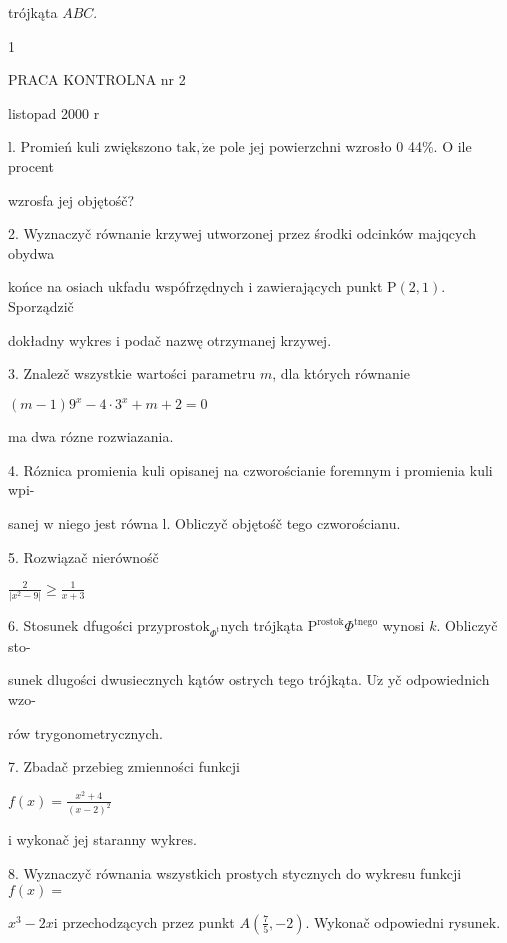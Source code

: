 \documentclass[a4paper,12pt]{article}
\begin{document}
trójkąta $ABC.$

1




PRACA KONTROLNA nr 2

listopad 2000 $\mathrm{r}$

l. Promień kuli zwiększono $\mathrm{t}\mathrm{a}\mathrm{k}, \dot{\mathrm{z}}\mathrm{e}$ pole jej powierzchni wzrosło $0$ 44\%. $\mathrm{O}$ ile procent

wzrosfa jej objętośč?

2. Wyznaczyč równanie krzywej utworzonej przez środki odcinków majqcych obydwa

końce na osiach ukfadu wspófrzędnych $\mathrm{i}$ zawierających punkt $\mathrm{P}(2,1)$. Sporządzič

dokładny wykres $\mathrm{i}$ podač nazwę otrzymanej krzywej.

3. Znalez$\acute{}$č wszystkie wartości parametru $m$, dla których równanie

$(m-1)9^{x}-4\cdot 3^{x}+m+2=0$

ma dwa rózne rozwiazania.

4. Róznica promienia kuli opisanej na czworościanie foremnym $\mathrm{i}$ promienia kuli wpi-

sanej $\mathrm{w}$ niego jest równa l. Obliczyč objętośč tego czworościanu.

5. Rozwiązač nierównośč

$\displaystyle \frac{2}{|x^{2}-9|}\geq\frac{1}{x+3}$

6. Stosunek dfugości $\mathrm{p}\mathrm{r}\mathrm{z}\mathrm{y}\mathrm{p}\mathrm{r}\mathrm{o}\mathrm{s}\mathrm{t}\mathrm{o}\mathrm{k}_{\Phi^{\mathrm{t}}}$nych trójkąta $\mathrm{P}^{\mathrm{r}\mathrm{o}\mathrm{s}\mathrm{t}\mathrm{o}\mathrm{k}}\Phi^{\mathrm{t}\mathrm{n}\mathrm{e}\mathrm{g}\mathrm{o}}$ wynosi $k$. Obliczyč sto-

sunek dlugości dwusiecznych kątów ostrych tego trójkąta. $\mathrm{U}\dot{\mathrm{z}}$ yč odpowiednich wzo-

rów trygonometrycznych.

7. Zbadač przebieg zmienności funkcji

$f(x)=\displaystyle \frac{x^{2}+4}{(x-2)^{2}}$

$\mathrm{i}$ wykonač jej staranny wykres.

8. Wyznaczyč równania wszystkich prostych stycznych do wykresu funkcji $f(x) =$

$x^{3}-2x\mathrm{i}$ przechodzących przez punkt $A(\displaystyle \frac{7}{5},-2)$. Wykonač odpowiedni rysunek.
\end{document}
